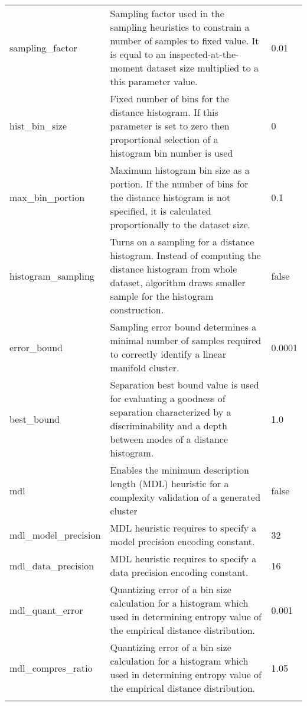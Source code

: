 \begin{longtable}[H]{@{\extracolsep{\fill}}lp{4in}p{.7in}@{}}
sampling\_factor & Sampling factor used in the sampling heuristics to constrain a number of samples to fixed value. It is equal to an inspected-at-the-moment dataset size multiplied to a this parameter value. & 0.01 \\ \addlinespace

hist\_bin\_size & Fixed number of bins for the distance histogram. If this parameter is set to zero then proportional selection of a histogram bin number is used & 0 \\ \addlinespace

max\_bin\_portion & Maximum histogram bin size as a portion. If the number of bins for the distance histogram is not specified, it is calculated proportionally to the dataset size. & 0.1 \\ \addlinespace

histogram\_sampling & Turns on a sampling for a distance histogram. Instead of computing the distance histogram from whole dataset, algorithm draws smaller sample for the histogram construction. & false \\ \addlinespace

error\_bound & Sampling error bound determines a minimal number of samples required to correctly identify a linear manifold cluster. & 0.0001 \\ \addlinespace

best\_bound & Separation best bound value is used for evaluating a goodness of separation characterized by a discriminability and a depth between modes of a distance histogram. & 1.0 \\ \addlinespace

mdl & Enables the minimum description length (MDL) heuristic for a complexity validation of a generated cluster & false \\ \addlinespace

mdl\_model\_precision & MDL heuristic requires to specify a model precision encoding constant. & 32 \\ \addlinespace

mdl\_data\_precision & MDL heuristic requires to specify a data precision encoding constant. & 16 \\ \addlinespace

mdl\_quant\_error & Quantizing error of a bin size calculation for a histogram which used in determining entropy value of the empirical distance distribution. & 0.001 \\ \addlinespace

mdl\_compres\_ratio & Quantizing error of a bin size calculation for a histogram which used in determining entropy value of the empirical distance distribution. & 1.05 \\ \addlinespace


\end{longtable}
